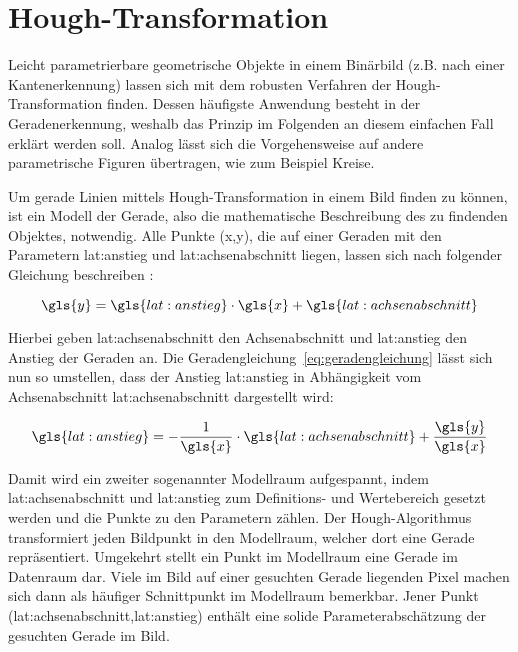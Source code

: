 \section{Hough-Transformation \dcfirstauthorshort}
\label{sec:grundlagen:hough}

Leicht parametrierbare geometrische Objekte in einem Binärbild (z.B. nach einer Kantenerkennung) lassen sich mit dem robusten Verfahren der Hough-Transformation finden. Dessen häufigste Anwendung besteht in der Geradenerkennung, weshalb das Prinzip im Folgenden an diesem einfachen Fall erklärt werden soll. Analog lässt sich die Vorgehensweise auf andere parametrische Figuren übertragen, wie zum Beispiel Kreise.

Um gerade Linien mittels Hough-Transformation in einem Bild finden zu können, ist ein Modell der Gerade, also die mathematische Beschreibung des zu findenden Objektes, notwendig. Alle Punkte (\gls{x},\gls{y}), die auf einer Geraden mit den Parametern \gls{lat:anstieg} und \gls{lat:achsenabschnitt} liegen, lassen sich nach folgender Gleichung beschreiben \autocite{jaehneDigitaleBildverarbeitungMit2005}:

\begin{equation}
\gls{y} = \gls{lat:anstieg} \cdot \gls{x} + \gls{lat:achsenabschnitt}
\label{eq:geradengleichung}
\end{equation}

Hierbei geben \gls{lat:achsenabschnitt} den Achsenabschnitt und \gls{lat:anstieg} den Anstieg der Geraden an. Die Geradengleichung~\eqref{eq:geradengleichung} lässt sich nun so umstellen, dass der Anstieg \gls{lat:anstieg} in Abhängigkeit vom Achsenabschnitt \gls{lat:achsenabschnitt}  dargestellt wird:

\begin{equation}
\gls{lat:anstieg} = -\frac{1}{\gls{x}} \cdot \gls{lat:achsenabschnitt} + \frac{\gls{y}}{\gls{x}}
\end{equation}

Damit wird ein zweiter sogenannter Modellraum aufgespannt, indem \gls{lat:achsenabschnitt} und \gls{lat:anstieg} zum Definitions- und Wertebereich gesetzt werden und die Punkte zu den Parametern zählen. Der Hough-Algorithmus transformiert jeden Bildpunkt in den Modellraum, welcher dort eine Gerade repräsentiert. Umgekehrt stellt ein Punkt im Modellraum eine Gerade im Datenraum dar. Viele im Bild auf einer gesuchten Gerade liegenden Pixel machen sich dann als häufiger Schnittpunkt im Modellraum bemerkbar. Jener Punkt (\gls{lat:achsenabschnitt},\gls{lat:anstieg}) enthält eine solide Parameterabschätzung der gesuchten Gerade im Bild.

